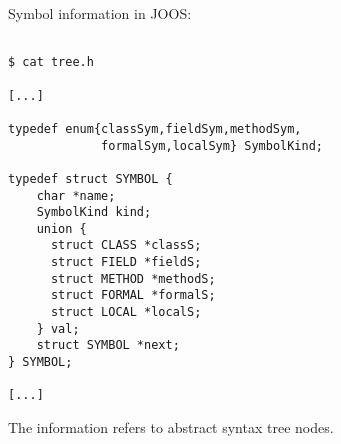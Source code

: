 \begin{slide*}
Symbol information in JOOS:

\begin{scriptsize}
\begin{verbatim}

$ cat tree.h

[...]

typedef enum{classSym,fieldSym,methodSym,
             formalSym,localSym} SymbolKind;
 
typedef struct SYMBOL {
    char *name;
    SymbolKind kind;
    union {
      struct CLASS *classS;
      struct FIELD *fieldS;
      struct METHOD *methodS;
      struct FORMAL *formalS;
      struct LOCAL *localS;
    } val;
    struct SYMBOL *next;
} SYMBOL; 

[...]
\end{verbatim}
\end{scriptsize}

The information refers to abstract syntax tree nodes.
\vfil
\end{slide*}
 

